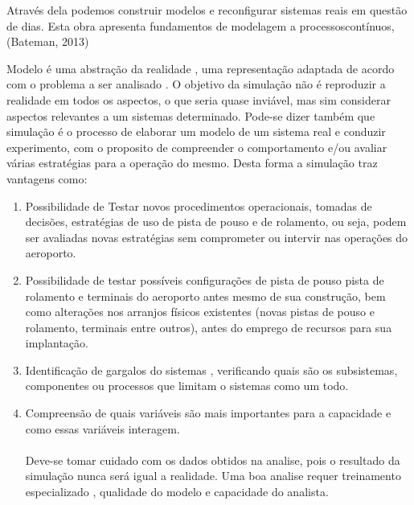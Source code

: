 \documentclass[12pt]{article}
\begin{document}
  
  Através dela podemos construir modelos e reconfigurar sistemas
  reais em questão de dias. Esta obra apresenta fundamentos de modelagem 
  a processoscontínuos, (Bateman, 2013)
  
  
  Modelo é uma abstração da realidade , uma representação adaptada de acordo
  com o problema a ser analisado . O objetivo da simulação não é reproduzir
  a realidade em todos os aspectos, o que seria quase inviável, mas sim 
  considerar aspectos relevantes a um sistemas determinado. Pode-se dizer
  também que simulação é o processo de elaborar um modelo de um sistema
  real e conduzir experimento, com o proposito de compreender o comportamento
  e/ou avaliar várias estratégias para a operação do mesmo. Desta forma a
  simulação traz vantagens como:
  
  
  
  
  \begin{enumerate}
  
  \item Possibilidade de Testar novos procedimentos operacionais, tomadas
   de decisões, estratégias de uso de pista de pouso e de rolamento, ou seja,
   podem ser avaliadas novas estratégias sem comprometer ou intervir nas 
   operações do aeroporto.
  
  \item Possibilidade de testar possíveis configurações de pista de pouso
    pista de rolamento e terminais do aeroporto antes mesmo de sua construção, 
    bem como alterações nos arranjos físicos existentes (novas pistas de pouso
    e rolamento, terminais entre outros), antes do emprego de recursos para
    sua implantação.
  
  \item Identificação de gargalos do sistemas , verificando quais são os 
    subsistemas, componentes ou processos que limitam o sistemas como um
    todo.
  
  \item Compreensão de quais variáveis são mais importantes para a capacidade
  e como essas variáveis interagem.
  
  \paragraph{}%
  Deve-se tomar cuidado com os dados obtidos na analise, pois o resultado 
  da simulação nunca será igual a realidade. Uma boa analise requer 
  treinamento especializado , qualidade do modelo e capacidade do analista.
  
  \end{enumerate}
  
\end{document}
